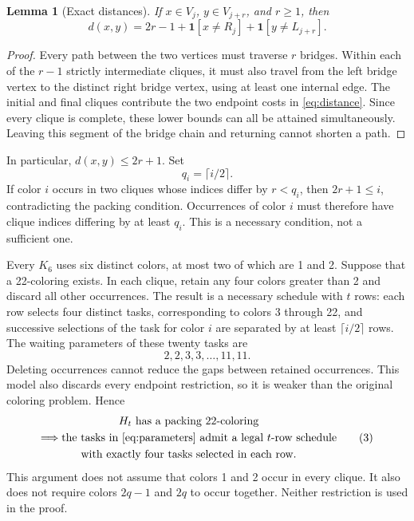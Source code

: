 \documentclass[11pt]{article}
\newtheorem{lemma}{Lemma}
\newcommand{\ind}{\mathbf{1}}
\begin{document}
\begin{lemma}[Exact distances]\label{lem:distance}
If $x\in V_j$, $y\in V_{j+r}$, and $r\geq 1$, then
\begin{equation*}
d(x,y)=2r-1+\ind[x\ne R_j]+\ind[y\ne L_{j+r}].
\tag{1}\label{eq:distance}
\end{equation*}
\end{lemma}

\begin{proof}
Every path between the two vertices must traverse $r$ bridges.
Within each of the $r-1$ strictly intermediate cliques, it must also
travel from the left bridge vertex to the distinct right bridge
vertex, using at least one internal edge. The initial and final
cliques contribute the two endpoint costs in
\eqref{eq:distance}. Since every clique is complete, these lower
bounds can all be attained simultaneously. Leaving this segment of
the bridge chain and returning cannot shorten a path.
\end{proof}

In particular, $d(x,y)\leq 2r+1$. Set
\[
q_i=\lceil i/2\rceil.
\]
If color $i$ occurs in two cliques whose indices differ by $r<q_i$,
then $2r+1\leq i$, contradicting the packing condition. Occurrences
of color $i$ must therefore have clique indices differing by at
least $q_i$. This is a necessary condition, not a sufficient one.

Every $K_6$ uses six distinct colors, at most two of which are 1 and
2. Suppose that a 22-coloring exists. In each clique, retain any
four colors greater than 2 and discard all other occurrences.
The result is a necessary schedule with $t$ rows: each row selects
four distinct tasks, corresponding to colors 3 through 22, and
successive selections of the task for color $i$ are separated by
at least $\lceil i/2\rceil$ rows. The waiting parameters of these
twenty tasks are
\begin{equation*}
2,2,3,3,\ldots,11,11.
\tag{2}\label{eq:parameters}
\end{equation*}
Deleting occurrences cannot reduce the gaps between retained
occurrences. This model also discards every endpoint restriction,
so it is weaker than the original coloring problem. Hence
\begin{equation*}
\begin{gathered}
H_t\text{ has a packing 22-coloring}\\
\Longrightarrow
\text{the tasks in \eqref{eq:parameters} admit a legal $t$-row schedule}\\
\text{with exactly four tasks selected in each row.}
\end{gathered}
\tag{3}\label{eq:relaxation}
\end{equation*}
This argument does not assume that colors 1 and 2 occur in every
clique. It also does not require colors $2q-1$ and $2q$ to occur
together. Neither restriction is used in the proof.
\end{document}
